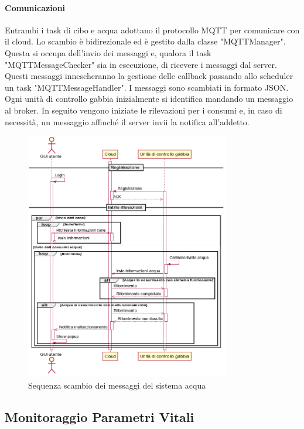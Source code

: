     \paragraph{Comunicazioni}
    Entrambi i task di cibo e acqua adottano il protocollo MQTT per comunicare con il cloud. Lo scambio è bidirezionale ed è gestito dalla classe "MQTTManager". Questa si occupa dell'invio dei messaggi e, qualora il task "MQTTMessageChecker" sia in esecuzione, di ricevere i messaggi dal server. Questi messaggi innescheranno la gestione delle callback passando allo scheduler un task "MQTTMessageHandler".
    I messaggi sono scambiati in formato JSON. 
    Ogni unità di controllo gabbia inizialmente si identifica mandando un messaggio al broker. In seguito vengono iniziate le rilevazioni per i consumi e, in caso di necessità, un messaggio affinché il server invii la notifica all'addetto.
    \begin{figure}[H]
        \caption{Sequenza scambio dei messaggi del sistema acqua}
        \label{fig:sequencewater}
        \centering
        \includegraphics[width=0.8\textwidth]{DrawIo/sequenceWaterAutomation.png}
    \end{figure}

\subsection{Monitoraggio Parametri Vitali}
